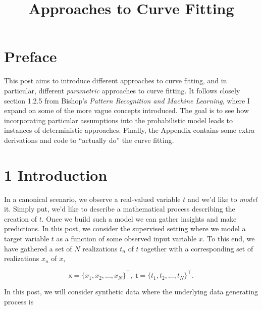 \documentclass[
  0.875em,
  letterpaper,
  DIV=11,
  numbers=noendperiod]{scrartcl}
\title{Approaches to Curve Fitting}
\author{}
\date{}
\renewcommand*\contentsname{Table of contents}
\newcommand\contentsname{Table of contents}
\begin{document}
\maketitle
\ifdefined\Shaded\renewenvironment{Shaded}{\begin{tcolorbox}[breakable, boxrule=0pt, interior hidden, sharp corners, enhanced, frame hidden, borderline west={3pt}{0pt}{shadecolor}]}{\end{tcolorbox}}\fi

\renewcommand*\contentsname{Table of contents}
{
\hypersetup{linkcolor=}
\setcounter{tocdepth}{3}
\tableofcontents
}
\hypertarget{preface}{%
\section{Preface}\label{preface}}

This post aims to introduce different approaches to curve fitting, and
in particular, different \emph{parametric} approaches to curve fitting.
It follows closely section 1.2.5 from Bishop's \emph{Pattern Recognition
and Machine Learning}, where I expand on some of the more vague concepts
introduced. The goal is to see how incorporating particular assumptions
into the probabilistic model leads to instances of deterministic
approaches. Finally, the Appendix contains some extra derivations and
code to ``actually do'' the curve fitting.

\hypertarget{introduction}{%
\section{1 Introduction}\label{introduction}}

In a canonical scenario, we observe a real-valued variable \(t\) and
we'd like to \emph{model} it. Simply put, we'd like to describe a
mathematical process describing the creation of \(t\). Once we build
such a model we can gather insights and make predictions. In this post,
we consider the supervised setting where we model a target variable
\(t\) as a function of some observed input variable \(x\). To this end,
we have gathered a set of \(N\) realizations \(t_n\) of \(t\) together
with a corresponding set of realizations \(x_n\) of \(x\),

\[
\pmb{\mathsf{x}} = \{x_1, x_2, ..., x_N\}^\intercal, \; \pmb{\mathsf{t}} = \{t_1, t_2, ..., t_N\}^\intercal.
\]

In this post, we will consider synthetic data where the underlying data
generating process is
\end{document}
